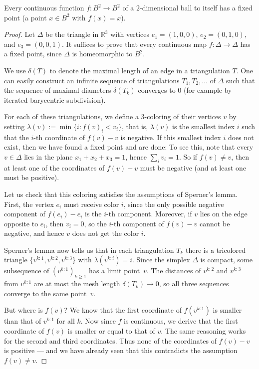 \begin{theorem}[Brouwer's Fixed Point Theorem (for $n = 2$)]
  \label{brouwer}
  Every continuous function $f : B^2 \to B^2$ of a $2$-dimensional ball to
  itself has a fixed point (a point $x \in B^2$ with $f(x) = x$).
\end{theorem}
\begin{proof}
  \leanok
  Let $\Delta$ be the triangle in $\mathbb{R}^3$ with vertices $e_1 = (1,0,0)$,
  $e_2 = (0,1,0)$, and $e_3 = (0,0,1)$. It suffices to prove that every continuous
  map $f : \Delta \to \Delta$ has a fixed point, since $\Delta$ is homeomorphic to $B^2$.

  We use $\delta(T)$ to denote the maximal length of an edge in a triangulation $T$.
  One can easily construct an infinite sequence of triangulations $T_1, T_2, \dots$
  of $\Delta$ such that the sequence of maximal diameters $\delta(T_k)$ converges to $0$
  (for example by iterated barycentric subdivision).

  For each of these triangulations, we define a $3$-coloring of their vertices $v$
  by setting $\lambda(v) := \min\{i : f(v)_i < v_i\}$, that is, $\lambda(v)$ is the smallest
  index $i$ such that the $i$-th coordinate of $f(v) - v$ is negative. If this smallest index $i$
  does not exist, then we have found a fixed point and are done: To see this, note that every
  $v \in \Delta$ lies in the plane $x_1 + x_2 + x_3 = 1$, hence $\sum_i v_i = 1$. So if
  $f(v) \neq v$, then at least one of the coordinates of $f(v) - v$ must be negative (and at
  least one must be positive).

  Let us check that this coloring satisfies the assumptions of Sperner's lemma.
  First, the vertex $e_i$ must receive color $i$, since the only possible negative
  component of $f(e_i) - e_i$ is the $i$-th component. Moreover, if $v$ lies on the
  edge opposite to $e_i$, then $v_i = 0$, so the $i$-th component of $f(v) - v$ cannot
  be negative, and hence $v$ does not get the color $i$.

  Sperner's lemma now tells us that in each triangulation $T_k$ there is a tricolored
  triangle $\{v^{k:1}, v^{k:2}, v^{k:3}\}$ with $\lambda(v^{k:i}) = i$.
  Since the simplex $\Delta$ is compact, some subsequence of $(v^{k:1})_{k \geq 1}$ has a
  limit point~$v$. The distances of $v^{k:2}$ and $v^{k:3}$ from $v^{k:1}$ are at most the
  mesh length $\delta(T_k) \to 0$, so all three sequences converge to the same point~$v$.

  But where is $f(v)$? We know that the first coordinate of $f(v^{k:1})$ is smaller
  than that of $v^{k:1}$ for all $k$. Now since $f$ is continuous, we derive that the
  first coordinate of $f(v)$ is smaller or equal to that of $v$. The same reasoning
  works for the second and third coordinates. Thus none of the coordinates
  of $f(v) - v$ is positive --- and we have already seen that this contradicts
  the assumption $f(v) \neq v$.
\end{proof}
